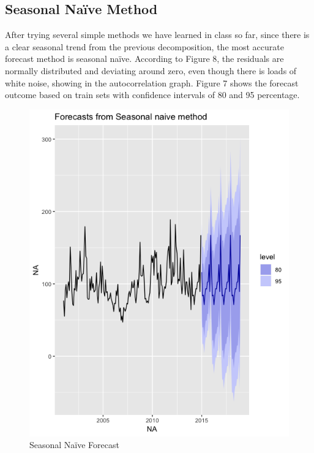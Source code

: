 \documentclass[12pt]{article}
\begin{document}
\subsection{Seasonal Naïve Method}
After trying several simple methods we have learned in class so far, since there is a clear seasonal trend from the previous decomposition, the most accurate forecast method is seasonal naïve. According to Figure 8, the residuals are normally distributed and deviating around zero, even though there is loads of white noise, showing in the autocorrelation graph. Figure 7 shows the forecast outcome based on train sets with confidence intervals of 80 and 95 percentage. 
\begin{figure}[!tbp]
  \begin{minipage}[b]{0.49\textwidth}
    \includegraphics[width=\textwidth]{Pre_sn.png}
    \caption{Seasonal Naïve Forecast}
  \end{minipage}
  \hfill
  \begin{minipage}[b]{0.49\textwidth}

\end{minipage}
\end{figure}
\end{document}

